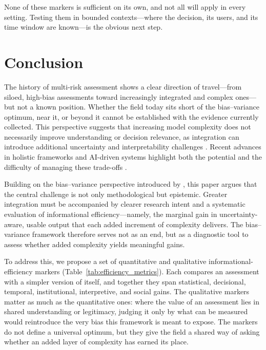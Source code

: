 \documentclass[12pt]{article}
\begin{document}
None of these markers is sufficient on its own, and not all will apply in every setting. Testing them in bounded contexts---where the decision, its users, and its time window are known---is the obvious next step.

\FloatBarrier
\section{Conclusion}

The history of multi-risk assessment shows a clear direction of travel---from siloed, high-bias assessments toward increasingly integrated and complex ones---but not a known position. Whether the field today sits short of the bias--variance optimum, near it, or beyond it cannot be established with the evidence currently collected. This perspective suggests that increasing model complexity does not necessarily improve understanding or decision relevance, as integration can introduce additional uncertainty and interpretability challenges \citep{puy2022models, saltelli2020five}. Recent advances in holistic frameworks and AI-driven systems highlight both the potential and the difficulty of managing these trade-offs \citep{ward2026reducing, reichstein2025early}.

Building on the bias–variance perspective introduced by \citet{Dunant2021}, this paper argues that the central challenge is not only methodological but epistemic. Greater integration must be accompanied by clearer research intent and a systematic evaluation of informational efficiency---namely, the marginal gain in uncertainty-aware, usable output that each added increment of complexity delivers. The bias–variance framework therefore serves not as an end, but as a diagnostic tool to assess whether added complexity yields meaningful gains.

To address this, we propose a set of quantitative and qualitative informational-efficiency markers (Table~\ref{tab:efficiency_metrics}). Each compares an assessment with a simpler version of itself, and together they span statistical, decisional, temporal, institutional, interpretive, and social gains. The qualitative markers matter as much as the quantitative ones: where the value of an assessment lies in shared understanding or legitimacy, judging it only by what can be measured would reintroduce the very bias this framework is meant to expose. The markers do not define a universal optimum, but they give the field a shared way of asking whether an added layer of complexity has earned its place.
\end{document}
